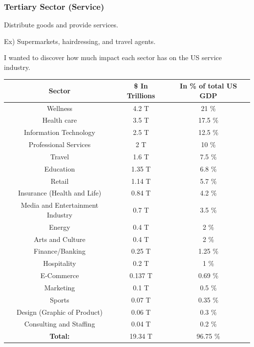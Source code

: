 \documentclass{article}
\newcounter{subsubsubsection}[subsubsection]
\begin{document}
\newpage





\subsubsection{Tertiary Sector (Service)}

Distribute goods and provide services. 

Ex) Supermarkets, hairdressing, and travel agents. 

\newpage








I wanted to discover how much impact each sector has on the US service industry.

\begin{center}
 \begin{tabular}{||c c c||} 
 \hline
 \textbf{Sector} & \textbf{\$ In Trillions} & \textbf{In \% of total US GDP} \\ [0.5ex] 
 \hline\hline
 Wellness & 4.2 T & 21 \% \\ [1ex] 
 \hline
 Health care & 3.5 T & 17.5 \% \\ [1ex] 
 \hline
 Information Technology & 2.5 T & 12.5 \% \\ 
 \hline
 Professional Services & 2 T & 10 \% \\ [1ex] 
 \hline
 Travel & 1.6 T & 7.5 \% \\
 \hline 
 Education & 1.35 T & 6.8 \% \\ [1ex] 
 \hline
 Retail & 1.14 T & 5.7 \% \\ [1ex] 
 \hline
 Insurance (Health and Life) & 0.84 T & 4.2 \% \\ [1ex] 
 \hline
 Media and Entertainment Industry & 0.7 T & 3.5 \%  \\
 \hline
 Energy & 0.4 T & 2 \% \\ [1ex] 
 \hline
 Arts and Culture & 0.4 T & 2 \% \\ [1ex] 
 \hline
 Finance/Banking & 0.25 T & 1.25 \% \\ [1ex] 
 \hline
 Hospitality & 0.2 T & 1 \% \\
 \hline
 E-Commerce & 0.137 T & 0.69 \% \\ [1ex] 
 \hline
 Marketing & 0.1 T & 0.5 \% \\ [1ex] 
 \hline
 Sports & 0.07 T & 0.35 \% \\ [1ex] 
 \hline
 Design (Graphic of Product) & 0.06 T & 0.3 \% \\ [1ex] 
 \hline
 Consulting and Staffing & 0.04 T & 0.2 \% \\ [1ex] 
 \hline
 \hline 
 \textbf{Total:} & 19.34 T & 96.75 \% \\ [1ex] 
 \hline
 \hline
\end{tabular}
\end{center}
\end{document}
